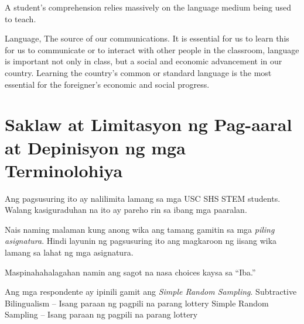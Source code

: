 \documentclass [12pt] {scrreprt}
\begin{document}
A student's comprehension relies massively on the language medium being used to
teach. 

Language, The source of our communications. It is essential for us to learn this
for us to communicate or to interact with other people in the classroom,
language is important not only in class, but a social and economic advancement
in our country. Learning the country's common or standard language is  the most
essential for the foreigner's economic and social progress. 

\pagebreak
\section {Saklaw at Limitasyon ng Pag-aaral at Depinisyon ng mga Terminolohiya}
Ang pagsusuring ito ay nalilimita lamang sa mga USC SHS STEM students. Walang
kasiguraduhan na ito ay pareho rin sa ibang mga paaralan.

Nais naming malaman kung anong wika ang tamang gamitin sa mga \emph{piling
  asignatura}. Hindi layunin ng pagsusuring ito ang magkaroon ng iisang wika
lamang sa lahat ng mga asignatura.

Maspinahahalagahan namin ang sagot na nasa choices kaysa sa ``Iba.''

Ang mga respondente ay ipinili gamit ang \emph{Simple Random Sampling}.
\vfill
Subtractive Bilingualism -- Isang paraan ng pagpili na parang lottery
Simple Random Sampling -- Isang paraan ng pagpili na parang lottery
\pagebreak
\end{document}
